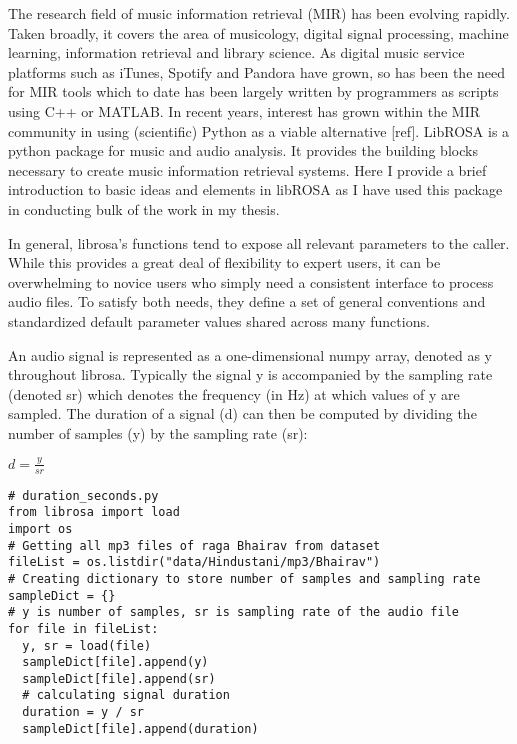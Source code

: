 \doublespacing
\setlength{\parindent}{1cm}

The research field of music information retrieval (MIR) has been evolving rapidly. Taken broadly, it covers the area of musicology, digital signal processing, machine learning, information retrieval and library science. As digital music service platforms such as iTunes, Spotify and Pandora have grown, so has been the need for MIR tools which to date has been largely written by programmers as scripts using C++ or MATLAB. In recent years, interest has grown within the MIR community in using (scientific) Python as a viable alternative [ref]. LibROSA is a python package for music and audio analysis. It provides the building blocks necessary to create music information retrieval systems. Here I provide a brief introduction to basic ideas and elements in libROSA as I have used this package in conducting bulk of the work in my thesis.
\par
In general, librosa’s functions tend to expose all relevant parameters to the caller. While this provides a great deal of flexibility to expert users, it can be overwhelming to novice users who simply need a consistent interface to process audio files. To satisfy both needs, they define a set of general conventions and standardized default parameter values shared across many functions.
\par
An audio signal is represented as a one-dimensional numpy array, denoted as y throughout librosa. Typically the signal y is accompanied by the sampling rate (denoted sr) which denotes the frequency (in Hz) at which values of y are sampled. The duration of a signal (d) can then be computed by dividing the number of samples (y) by the sampling rate (sr): \par
\begin{center}
  $ d = \frac{y}{sr} $
\end{center}

\begin{lstlisting}
# duration_seconds.py
from librosa import load
import os
# Getting all mp3 files of raga Bhairav from dataset
fileList = os.listdir("data/Hindustani/mp3/Bhairav")
# Creating dictionary to store number of samples and sampling rate
sampleDict = {}
# y is number of samples, sr is sampling rate of the audio file
for file in fileList:
  y, sr = load(file)
  sampleDict[file].append(y)
  sampleDict[file].append(sr)
  # calculating signal duration
  duration = y / sr
  sampleDict[file].append(duration)
\end{lstlisting}

